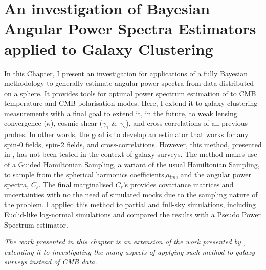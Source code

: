 %
\chapter[An investigation of Bayesian-$C_{\ell}$ Estimators applied to Galaxy Clustering]{An investigation of Bayesian Angular Power Spectra Estimators applied to Galaxy Clustering}\label{Chap:BPL}


\vspace*{\fill}

In this Chapter, I present an investigation for applications of a fully Bayesian methodology to generally estimate angular power spectra from data distributed on a sphere. It provides tools for optimal power spectrum estimation of to CMB temperature and CMB polarisation modes. Here, I extend it to galaxy clustering measurements with a final goal to extend it, in the future, to weak lensing convergence ($\kappa$), cosmic shear ($\gamma_1$ \& $\gamma_2$), and cross-correlations of all previous probes. In other words, the goal is to develop an estimator that works for any spin-0 fields, spin-2 fields, and cross-correlations. However, this method, presented in \cite{SreeThesis}, has not been tested in the context of galaxy surveys. The method makes use of a Guided Hamiltonian Sampling, a variant of the usual Hamiltonian Sampling, to sample from the spherical harmonics coefficients,$a_{lm}$, and the angular power spectra, $C_{\ell}$. The final marginalised $C_{\ell}$'s provides covariance matrices and uncertainties with no the need of simulated mocks due to the sampling nature of the problem. I applied this method to partial and full-sky simulations, including Euclid-like log-normal simulations and compared the results with a Pseudo Power Spectrum estimator.

\textit{The work presented in this chapter is an extension of the work presented by \cite{SreeThesis}, extending it to investigating the many aspects of applying such method to galaxy surveys instead of CMB data.}

\newpage

